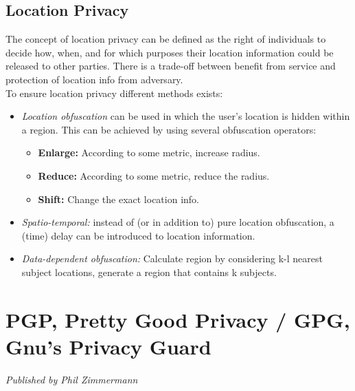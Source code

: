 \documentclass{article}
\begin{document}
\subsection{Location Privacy}
The concept of location privacy can be defined as the right of individuals to decide how, when, and for which purposes their location information could be released to other parties. There is a trade-off between benefit from service and protection of location info from adversary.\\
To ensure location privacy different methods exists: 
\begin{itemize}
    \item \textit{Location obfuscation} can be used in which the user's location is hidden within a region. This can be achieved by using several obfuscation operators:
\begin{itemize}
    \item \textbf{Enlarge:} According to some metric, increase radius.
    \item \textbf{Reduce:} According to some metric, reduce the radius.
    \item \textbf{Shift:} Change the exact location info.
\end{itemize}
\item \textit{Spatio-temporal:} instead of (or in addition to) pure location obfuscation, a (time) delay can be introduced to location information.
\item \textit{Data-dependent obfuscation:} Calculate region by considering k-l nearest subject locations, generate a region that contains k subjects.
\end{itemize} 

\newpage
\section{PGP, Pretty Good Privacy / GPG, Gnu's Privacy Guard}
\begin{center}
    \textit{Published by Phil Zimmermann}
\end{center}
\end{document}
